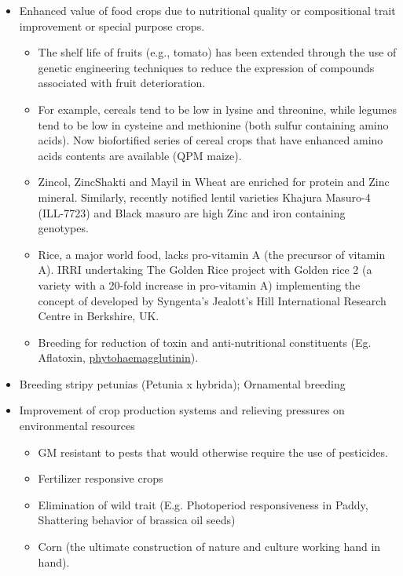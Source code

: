 \documentclass[11pt,ignorenonframetext,aspectratio=169]{beamer}
\providecommand{\tightlist}{%
  \setlength{\itemsep}{0pt}\setlength{\parskip}{0pt}}
\begin{document}
\begin{frame}{}
\protect\hypertarget{section-17}{}
\begin{itemize}
\tightlist
\item
  Enhanced value of food crops due to nutritional quality or
  compositional trait improvement or special purpose crops.

  \begin{itemize}
  \tightlist
  \item
    The shelf life of fruits (e.g., tomato) has been extended through
    the use of genetic engineering techniques to reduce the expression
    of compounds associated with fruit deterioration.
  \item
    For example, cereals tend to be low in lysine and threonine, while
    legumes tend to be low in cysteine and methionine (both sulfur
    containing amino acids). Now biofortified series of cereal crops
    that have enhanced amino acids contents are available (QPM maize).
  \item
    Zincol, ZincShakti and Mayil in Wheat are enriched for protein and
    Zinc mineral. Similarly, recently notified lentil varieties Khajura
    Masuro-4 (ILL-7723) and Black masuro are high Zinc and iron
    containing genotypes.
  \item
    Rice, a major world food, lacks pro-vitamin A (the precursor of
    vitamin A). IRRI undertaking The Golden Rice project with Golden
    rice 2 (a variety with a 20-fold increase in pro-vitamin A)
    implementing the concept of developed by Syngenta's Jealott's Hill
    International Research Centre in Berkshire, UK.
  \item
    Breeding for reduction of toxin and anti-nutritional constituents
    (Eg. Aflatoxin,
    \href{https://en.wikipedia.org/wiki/Phytohaemagglutinin}{phytohaemagglutinin}).
  \end{itemize}
\end{itemize}
\end{frame}

\begin{frame}{}
\protect\hypertarget{section-18}{}
\begin{itemize}
\tightlist
\item
  Breeding stripy petunias (Petunia x hybrida); Ornamental breeding
\item
  Improvement of crop production systems and relieving pressures on
  environmental resources

  \begin{itemize}
  \tightlist
  \item
    GM resistant to pests that would otherwise require the use of
    pesticides.
  \item
    Fertilizer responsive crops
  \item
    Elimination of wild trait (E.g. Photoperiod responsiveness in Paddy,
    Shattering behavior of brassica oil seeds)
  \item
    Corn (the ultimate construction of nature and culture working hand
    in hand).
  \end{itemize}
\end{itemize}
\end{frame}
\end{document}
